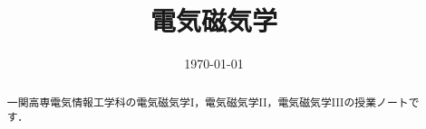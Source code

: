 

\title{電気磁気学}
\date{\today}



\maketitle
\pagestyle{fancy}

\begin{abstract}
一関高専電気情報工学科の電気磁気学I，電気磁気学II，電気磁気学IIIの授業ノートです．
\end{abstract}


\newpage


